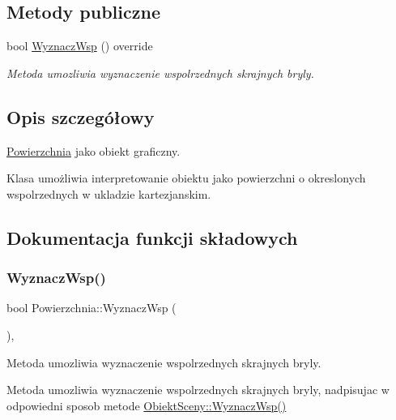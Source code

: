 \subsection*{Metody publiczne}
\begin{DoxyCompactItemize}
\item 
bool \hyperlink{classPowierzchnia_a8e2453f9f7e8f92d77bd5608ef3de005}{Wyznacz\+Wsp} () override
\begin{DoxyCompactList}\small\item\em Metoda umozliwia wyznaczenie wspolrzednych skrajnych bryly. \end{DoxyCompactList}\end{DoxyCompactItemize}


\subsection{Opis szczegółowy}
\hyperlink{classPowierzchnia}{Powierzchnia} jako obiekt graficzny. 

Klasa umożliwia interpretowanie obiektu jako powierzchni o okreslonych wspolrzednych w ukladzie kartezjanskim. 

\subsection{Dokumentacja funkcji składowych}
\mbox{\label{classPowierzchnia_a8e2453f9f7e8f92d77bd5608ef3de005}} 
\subsubsection{\texorpdfstring{Wyznacz\+Wsp()}{WyznaczWsp()}}
{\footnotesize\ttfamily bool Powierzchnia\+::\+Wyznacz\+Wsp (\begin{DoxyParamCaption}{ }\end{DoxyParamCaption})\hspace{0.3cm}{\ttfamily [override]}, {\ttfamily [virtual]}}



Metoda umozliwia wyznaczenie wspolrzednych skrajnych bryly. 

Metoda umozliwia wyznaczenie wspolrzednych skrajnych bryly, nadpisujac w odpowiedni sposob metode \hyperlink{classObiektSceny_a24dd0332c0755d7155128639a9a3e2b4}{Obiekt\+Sceny\+::\+Wyznacz\+Wsp()}

